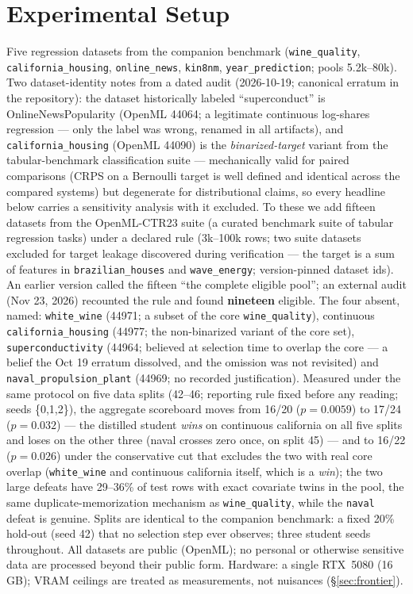 \documentclass[11pt]{article}
\begin{document}
\section{Experimental Setup}
\label{sec:setup}

Five regression datasets from the companion benchmark
(\texttt{wine\_quality}, \texttt{california\_\allowbreak housing},
\texttt{online\_news}, \texttt{kin8nm}, \texttt{year\_\allowbreak prediction}; pools
5.2k--80k). Two dataset-identity notes from a dated audit (2026-10-19;
canonical erratum in the repository): the dataset historically labeled
``superconduct'' is OnlineNewsPopularity (OpenML 44064; a legitimate
continuous log-shares regression --- only the label was wrong, renamed
in all artifacts), and \texttt{california\_\allowbreak housing} (OpenML 44090) is
the \emph{binarized-target} variant from the tabular-benchmark
classification suite --- mechanically valid for paired comparisons
(CRPS on a Bernoulli target is well defined and identical across the
compared systems) but degenerate for distributional claims, so every
headline below carries a sensitivity analysis with it excluded. To
these we add fifteen datasets from the OpenML-CTR23
suite \citep{fischer2023} (a curated benchmark suite of tabular
regression tasks) under a declared rule (3k--100k rows; two
suite datasets excluded for target leakage discovered during verification
--- the target is a sum of features in \texttt{brazilian\_\allowbreak houses} and
\texttt{wave\_energy}; version-pinned dataset ids). An earlier version
called the fifteen ``the complete eligible pool''; an external audit
(Nov 23, 2026) recounted the rule and found \textbf{nineteen} eligible.
The four absent, named: \texttt{white\_wine} (44971; a subset of the
core \texttt{wine\_quality}), continuous \texttt{california\_housing}
(44977; the non-binarized variant of the core set),
\texttt{superconductivity} (44964; believed at selection time to
overlap the core --- a belief the Oct 19 erratum dissolved, and the
omission was not revisited) and \texttt{naval\_propulsion\_plant}
(44969; no recorded justification). Measured under the same protocol
on five data splits (42--46; reporting rule fixed before any
reading; seeds \{0,1,2\}), the aggregate scoreboard moves from 16/20
($p=0.0059$) to 17/24 ($p=0.032$) --- the distilled student \emph{wins}
on continuous california on all five splits and loses on the other
three (naval crosses zero once, on split 45) ---
and to 16/22 ($p=0.026$) under the conservative cut that excludes the
two with real core overlap (\texttt{white\_wine} and continuous
california itself, which is a \emph{win}); the
two large defeats have 29--36\% of test rows with exact covariate twins
in the pool, the same duplicate-memorization mechanism as
\texttt{wine\_quality}, while the \texttt{naval} defeat is genuine. Splits are identical to
the companion benchmark: a fixed 20\% hold-out (seed 42) that no selection
step ever observes; three student seeds throughout. All datasets are
public (OpenML); no personal or otherwise sensitive data are processed
beyond their public form. Hardware: a single RTX~5080 (16\,GB); VRAM
ceilings are treated as measurements, not nuisances
(\S\ref{sec:frontier}).
\end{document}
